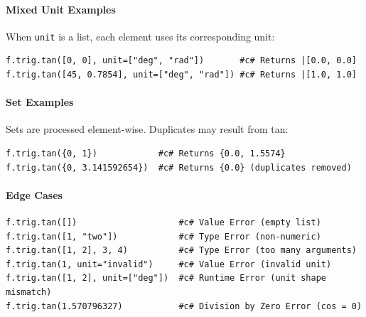 \paragraph{Mixed Unit Examples}
When \texttt{unit} is a list, each element uses its corresponding unit:
\begin{verbatim}
f.trig.tan([0, 0], unit=["deg", "rad"])       #c# Returns |[0.0, 0.0]
f.trig.tan([45, 0.7854], unit=["deg", "rad"]) #c# Returns |[1.0, 1.0]
\end{verbatim}

\paragraph{Set Examples}
Sets are processed element-wise. Duplicates may result from tan:
\begin{verbatim}
f.trig.tan({0, 1})            #c# Returns {0.0, 1.5574}
f.trig.tan({0, 3.141592654})  #c# Returns {0.0} (duplicates removed)
\end{verbatim}

\paragraph{Edge Cases}
\begin{verbatim}
f.trig.tan([])                    #c# Value Error (empty list)
f.trig.tan([1, "two"])            #c# Type Error (non-numeric)
f.trig.tan([1, 2], 3, 4)          #c# Type Error (too many arguments)
f.trig.tan(1, unit="invalid")     #c# Value Error (invalid unit)
f.trig.tan([1, 2], unit=["deg"])  #c# Runtime Error (unit shape mismatch)
f.trig.tan(1.570796327)           #c# Division by Zero Error (cos = 0)
\end{verbatim}

